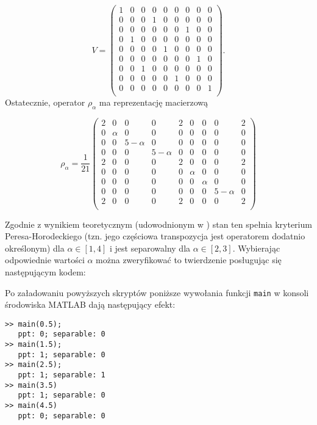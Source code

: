 $$
    V =
    \begin{pmatrix}
        1 & 0 & 0 & 0 & 0 & 0 & 0 & 0 & 0 \\
        0 & 0 & 0 & 1 & 0 & 0 & 0 & 0 & 0 \\
        0 & 0 & 0 & 0 & 0 & 0 & 1 & 0 & 0 \\
        0 & 1 & 0 & 0 & 0 & 0 & 0 & 0 & 0 \\
        0 & 0 & 0 & 0 & 1 & 0 & 0 & 0 & 0 \\
        0 & 0 & 0 & 0 & 0 & 0 & 0 & 1 & 0 \\
        0 & 0 & 1 & 0 & 0 & 0 & 0 & 0 & 0 \\
        0 & 0 & 0 & 0 & 0 & 1 & 0 & 0 & 0 \\
        0 & 0 & 0 & 0 & 0 & 0 & 0 & 0 & 1 \\
    \end{pmatrix}.
$$
Ostatecznie, operator $\rho_{\alpha}$ ma reprezentację macierzową

$$
    \rho_{\alpha} = \frac{1}{21}
    \begin{pmatrix}
        2 & 0 & 0 & 0 & 2 & 0 & 0 & 0 & 2 \\
        0 & \alpha & 0 & 0 & 0 & 0 & 0 & 0 & 0 \\
        0 & 0 & 5 - \alpha & 0 & 0 & 0 & 0 & 0 & 0 \\
        0 & 0 & 0 & 5 - \alpha & 0 & 0 & 0 & 0 & 0 \\
        2 & 0 & 0 & 0 & 2 & 0 & 0 & 0 & 2 \\
        0 & 0 & 0 & 0 & 0 & \alpha & 0 & 0 & 0 \\
        0 & 0 & 0 & 0 & 0 & 0 & \alpha & 0 & 0 \\
        0 & 0 & 0 & 0 & 0 & 0 & 0 & 5 - \alpha & 0 \\
        2 & 0 & 0 & 0 & 2 & 0 & 0 & 0 & 2 \\
    \end{pmatrix}
$$

Zgodnie z wynikiem teoretycznym (udowodnionym w \cite{work}) stan ten spełnia kryterium Peresa-Horodeckiego (tzn. jego częściowa transpozycja jest operatorem dodatnio określonym) dla $\alpha \in [1, 4]$ i jest separowalny dla $\alpha \in [2, 3]$. Wybierając odpowiednie wartości $\alpha$ można zweryfikować to twierdzenie posługując się następującym kodem:



\newpage



Po załadowaniu powyższych skryptów poniższe wywołania funkcji \verb+main+ w konsoli środowiska MATLAB dają następujący efekt:

\begin{verbatim}
>> main(0.5);
   ppt: 0; separable: 0
>> main(1.5);
   ppt: 1; separable: 0
>> main(2.5);
   ppt: 1; separable: 1
>> main(3.5)
   ppt: 1; separable: 0
>> main(4.5)
   ppt: 0; separable: 0
\end{verbatim}